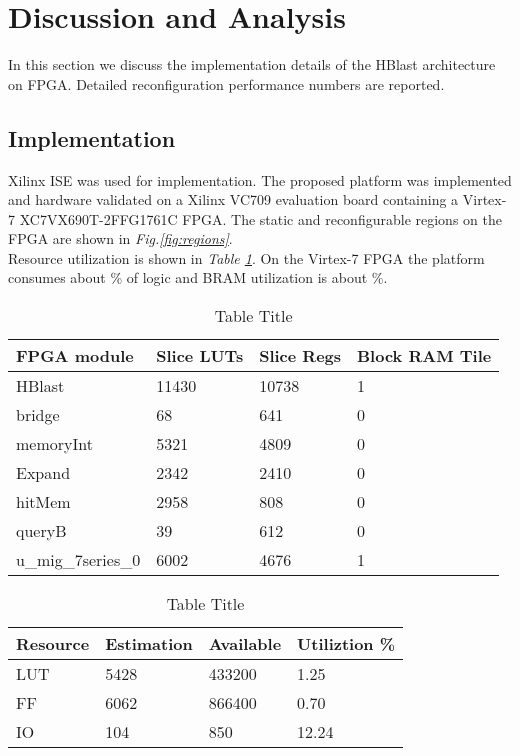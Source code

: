 \section{Discussion and Analysis}
\label{sec:discussion}

\quad In this section we discuss the implementation details of the HBlast architecture on FPGA. Detailed reconfiguration performance numbers are reported. 

\subsection{Implementation}
\quad Xilinx ISE was used for implementation. The proposed platform was implemented and hardware validated on a Xilinx VC709 evaluation board containing a Virtex-7 XC7VX690T-2FFG1761C FPGA. The static and reconfigurable regions on the FPGA are shown in \textit{Fig.\ref{fig:regions}}. 
\\

Resource utilization is shown in \textit{Table \ref{tab:title}}. On the Virtex-7 FPGA the platform consumes about \% of logic and BRAM utilization is about \%.

\begin{table}[!t]
\caption {Table Title} \label{tab:title}
\begin{tabular}{l|l|l|l}
\hline
FPGA module        & Slice LUTs & Slice Regs & Block RAM Tile \\ \hline
HBlast             & 11430      & 10738      & 1              \\
bridge             & 68         & 641        & 0              \\
memoryInt          & 5321       & 4809       & 0              \\
Expand             & 2342       & 2410       & 0              \\
hitMem             & 2958       & 808        & 0              \\
queryB             & 39         & 612        & 0              \\
u\_mig\_7series\_0 & 6002       & 4676       & 1              \\ \hline

\end{tabular}
\end{table}


\begin{table}[]
\begin{center}
\caption {Table Title} \label{tab:title2}
\begin{tabular}{|l|l|l|l|}
\hline
Resource & Estimation & Available & Utiliztion \% \\ \hline
LUT      & 5428       & 433200    & 1.25          \\
FF       & 6062       & 866400    & 0.70          \\
IO       & 104        & 850       & 12.24         \\ \hline
\end{tabular}
\end{center}
\end{table}


